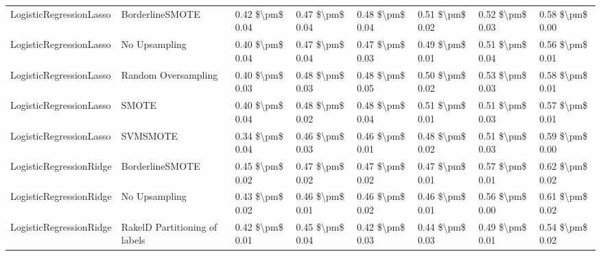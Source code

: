 \begin{tabular}{llllllll}
        LogisticRegressionLasso &               BorderlineSMOTE & 0.42 \$\textbackslash pm\$ 0.04 &           0.47 \$\textbackslash pm\$ 0.04 &       0.48 \$\textbackslash pm\$ 0.04 &        0.51 \$\textbackslash pm\$ 0.02 &                         0.52 \$\textbackslash pm\$ 0.03 &     0.58 \$\textbackslash pm\$ 0.00 \\
        LogisticRegressionLasso &                 No Upsampling & 0.40 \$\textbackslash pm\$ 0.04 &           0.47 \$\textbackslash pm\$ 0.04 &       0.47 \$\textbackslash pm\$ 0.03 &        0.49 \$\textbackslash pm\$ 0.01 &                         0.51 \$\textbackslash pm\$ 0.04 &     0.56 \$\textbackslash pm\$ 0.01 \\
        LogisticRegressionLasso &           Random Oversampling & 0.40 \$\textbackslash pm\$ 0.03 &           0.48 \$\textbackslash pm\$ 0.03 &       0.48 \$\textbackslash pm\$ 0.05 &        0.50 \$\textbackslash pm\$ 0.02 &                         0.53 \$\textbackslash pm\$ 0.03 &     0.58 \$\textbackslash pm\$ 0.01 \\
        LogisticRegressionLasso &                         SMOTE & 0.40 \$\textbackslash pm\$ 0.04 &           0.48 \$\textbackslash pm\$ 0.02 &       0.48 \$\textbackslash pm\$ 0.04 &        0.51 \$\textbackslash pm\$ 0.01 &                         0.51 \$\textbackslash pm\$ 0.03 &     0.57 \$\textbackslash pm\$ 0.01 \\
        LogisticRegressionLasso &                      SVMSMOTE & 0.34 \$\textbackslash pm\$ 0.04 &           0.46 \$\textbackslash pm\$ 0.03 &       0.46 \$\textbackslash pm\$ 0.01 &        0.48 \$\textbackslash pm\$ 0.02 &                         0.51 \$\textbackslash pm\$ 0.03 &     0.59 \$\textbackslash pm\$ 0.00 \\
        LogisticRegressionRidge &               BorderlineSMOTE & 0.45 \$\textbackslash pm\$ 0.02 &           0.47 \$\textbackslash pm\$ 0.02 &       0.47 \$\textbackslash pm\$ 0.02 &        0.47 \$\textbackslash pm\$ 0.01 &                         0.57 \$\textbackslash pm\$ 0.01 &     0.62 \$\textbackslash pm\$ 0.02 \\
        LogisticRegressionRidge &                 No Upsampling & 0.43 \$\textbackslash pm\$ 0.02 &           0.46 \$\textbackslash pm\$ 0.01 &       0.46 \$\textbackslash pm\$ 0.02 &        0.46 \$\textbackslash pm\$ 0.01 &                         0.56 \$\textbackslash pm\$ 0.00 &     0.61 \$\textbackslash pm\$ 0.02 \\
        LogisticRegressionRidge & RakelD Partitioning of labels & 0.42 \$\textbackslash pm\$ 0.01 &           0.45 \$\textbackslash pm\$ 0.04 &       0.42 \$\textbackslash pm\$ 0.03 &        0.44 \$\textbackslash pm\$ 0.03 &                         0.49 \$\textbackslash pm\$ 0.01 &     0.54 \$\textbackslash pm\$ 0.02 \\

\end{tabular}
